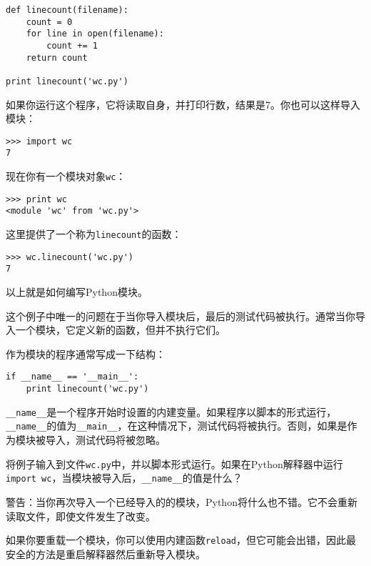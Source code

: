 \beforeverb
\begin{verbatim}
def linecount(filename):
    count = 0
    for line in open(filename):
        count += 1
    return count

print linecount('wc.py')
\end{verbatim}
\afterverb
%
如果你运行这个程序，它将读取自身，并打印行数，结果是7。你也可以这样导入模块：

\beforeverb
\begin{verbatim}
>>> import wc
7
\end{verbatim}
\afterverb
%
现在你有一个模块对象{\tt wc}：


\beforeverb
\begin{verbatim}
>>> print wc
<module 'wc' from 'wc.py'>
\end{verbatim}
\afterverb
%
这里提供了一个称为\verb"linecount"的函数：

\beforeverb
\begin{verbatim}
>>> wc.linecount('wc.py')
7
\end{verbatim}
\afterverb
%
以上就是如何编写Python模块。

这个例子中唯一的问题在于当你导入模块后，最后的测试代码被执行。通常当你导入一个模块，它定义新的函数，但并不执行它们。



作为模块的程序通常写成一下结构：

\beforeverb
\begin{verbatim}
if __name__ == '__main__':
    print linecount('wc.py')
\end{verbatim}
\afterverb
%
\verb"__name__"是一个程序开始时设置的内建变量。如果程序以脚本的形式运行，\verb"__name__"的值为\verb"__main__"，在这种情况下，测试代码将被执行。否则，如果是作为模块被导入，测试代码将被忽略。

\begin{ex}
将例子输入到文件{\tt wc.py}中，并以脚本形式运行。如果在Python解释器中运行{\tt import wc}，当模块被导入后，\verb"__name__"的值是什么？

警告：当你再次导入一个已经导入的的模块，Python将什么也不错。它不会重新读取文件，即使文件发生了改变。

如果你要重载一个模块，你可以使用内建函数{\tt reload}，但它可能会出错，因此最安全的方法是重启解释器然后重新导入模块。
\end{ex}



